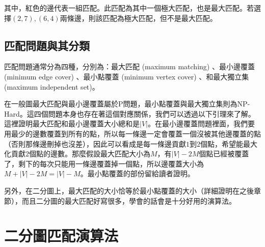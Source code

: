 其中，紅色的邊代表一組匹配。此匹配為其中一個極大匹配，也是最大匹配。若選擇$(2, 7), (6, 4)$兩條邊，則該匹配為極大匹配，但不是最大匹配。

\subsection{匹配問題與其分類}
匹配問題通常分為四種，分別為：最大匹配 (maximum matching) 、最小邊覆蓋 (minimum edge cover) 、最小點覆蓋 (minimum vertex cover) 、和最大獨立集 (maximum independent set)。
\par 在一般圖最大匹配與最小邊覆蓋屬於P問題，最小點覆蓋與最大獨立集則為NP-Hard。這四個問題本身也存在著這個對應關係，我們可以透過以下引理來了解。
這裡證明最大匹配和最小邊覆蓋大小總和是$|V|$。在最小邊覆蓋問題裡面，我們要用最少的邊數覆蓋到所有的點，所以每一條邊一定會覆蓋一個沒被其他邊覆蓋的點（否則那條邊刪掉也沒差），因此可以看成是每一條邊貢獻$1$到$2$個點，希望能最大化貢獻$2$個點的邊數。那麼假設最大匹配大小為$M$，有$|V| - 2M$個點已經被覆蓋了，剩下的每次只能用一條邊覆蓋掉一個點，所以邊覆蓋大小為$M + |V| - 2M = |V| - M$。最小點覆蓋的部份留給讀者證明。
\par 另外，在二分圖上，最大匹配的大小恰等於最小點覆蓋的大小（詳細證明在之後章節），而且二分圖的最大匹配好寫很多，學會的話會是十分好用的演算法。

\section{二分圖匹配演算法}

